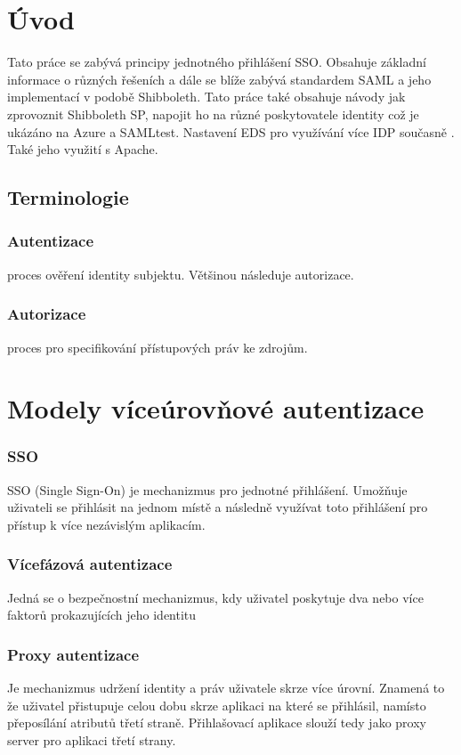 \chapter{Úvod}
Tato práce se zabývá principy jednotného přihlášení SSO. Obsahuje základní informace o různých řešeních a dále se blíže zabývá standardem SAML a jeho implementací v podobě Shibboleth. 
Tato práce také obsahuje návody jak zprovoznit Shibboleth SP, napojit ho na různé poskytovatele identity což je ukázáno na Azure a SAMLtest. Nastavení EDS pro využívání více IDP současně . Také jeho využití s Apache.
\section{Terminologie}
\subsection{Autentizace}
proces ověření identity subjektu. Většinou následuje autorizace.\cite{Authorization}
\subsection{Autorizace}
proces pro specifikování přístupových práv ke zdrojům.\cite{Autentizace}


\chapter{Modely víceúrovňové autentizace}
\subsection{SSO}
\label{sso}
SSO (Single Sign-On) je mechanizmus pro jednotné přihlášení. Umožňuje uživateli se přihlásit na jednom místě a následně využívat toto přihlášení pro přístup k více nezávislým aplikacím. \cite{SSO}

\subsection{Vícefázová autentizace}
Jedná se o bezpečnostní mechanizmus, kdy uživatel poskytuje dva nebo více faktorů prokazujících jeho identitu \cite{wiki2FA}


\subsection{Proxy autentizace}
Je mechanizmus udržení identity a práv uživatele skrze více úrovní. Znamená to že uživatel přistupuje celou dobu skrze aplikaci na které se přihlásil, namísto přeposílání atributů třetí straně. Přihlašovací aplikace slouží tedy jako proxy server pro aplikaci třetí strany. \cite{ProxyA}

